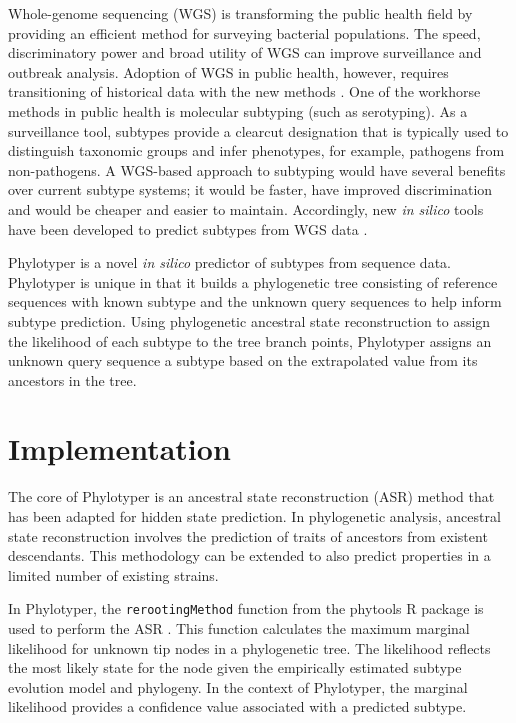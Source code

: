 \documentclass{bioinfo}
\begin{document}
Whole-genome sequencing (WGS) is transforming the public health field by providing an efficient method for surveying bacterial populations.
The speed, discriminatory power and broad utility of WGS can improve surveillance and outbreak analysis.
Adoption of WGS in public health, however, requires transitioning of historical data with the new methods \citep{Jenkins2015}.
One of the workhorse methods in public health is molecular subtyping (such as serotyping).
As a surveillance tool, subtypes provide a clearcut designation that is typically used to distinguish taxonomic groups and infer phenotypes, for example, pathogens from non-pathogens.
A WGS-based approach to subtyping would have several benefits over current subtype systems; it would be faster, have improved discrimination and would be cheaper and easier to maintain\citep{Jenkins2015}.
Accordingly, new \textit{in silico} tools have been developed to predict subtypes from WGS data \citep{Joensen2015,Ingle2016,CARRILLO2016}.

Phylotyper is a novel \textit{in silico} predictor of subtypes from sequence data. 
Phylotyper is unique in that it builds a phylogenetic tree consisting of reference sequences with known subtype and the unknown query sequences to help inform subtype prediction. 
Using phylogenetic ancestral state reconstruction to assign the likelihood of each subtype to the tree branch points, Phylotyper assigns an unknown query sequence a subtype based on the extrapolated value from its ancestors in the tree.

\section{Implementation}

The core of Phylotyper is an ancestral state reconstruction (ASR) method that has been adapted for hidden state prediction.
In phylogenetic analysis, ancestral state reconstruction involves the prediction of traits of ancestors from existent descendants.
This methodology can be extended to also predict properties in a limited number of existing strains.

In Phylotyper, the \texttt{rerootingMethod} function from the phytools R package is used to perform the ASR \citep{Revell2011}.
This function calculates the maximum marginal likelihood for unknown tip nodes in a phylogenetic tree.
The likelihood reflects the most likely state for the node given the empirically estimated subtype evolution model and phylogeny.
In the context of Phylotyper, the marginal likelihood provides a confidence value associated with a predicted subtype.
\end{document}
